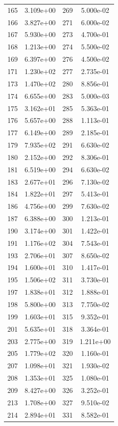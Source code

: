 \documentclass[12pt]{article}
\begin{document}
\begin{longtable}{@{}cccc@{}}
165 & 3.109e+00 & 269 & 5.000e-02 \\
166 & 3.827e+00 & 271 & 6.000e-02 \\
167 & 5.930e+00 & 273 & 4.700e-01 \\
168 & 1.213e+00 & 274 & 5.500e-02 \\
169 & 6.397e+00 & 276 & 4.500e-02 \\
171 & 1.230e+02 & 277 & 2.735e-01 \\
173 & 1.470e+02 & 280 & 8.856e-01 \\
174 & 6.655e+00 & 283 & 5.000e-03 \\
175 & 3.162e+01 & 285 & 5.363e-01 \\
176 & 5.657e+00 & 288 & 1.113e-01 \\
177 & 6.149e+00 & 289 & 2.185e-01 \\
179 & 7.935e+02 & 291 & 6.630e-02 \\
180 & 2.152e+00 & 292 & 8.306e-01 \\
181 & 6.519e+00 & 294 & 6.630e-02 \\
183 & 2.677e+01 & 296 & 7.130e-02 \\
184 & 1.822e+01 & 297 & 5.413e-01 \\
186 & 4.756e+00 & 299 & 7.630e-02 \\
187 & 6.388e+00 & 300 & 1.213e-01 \\
190 & 3.174e+00 & 301 & 1.422e-01 \\
191 & 1.176e+02 & 304 & 7.543e-01 \\
193 & 2.706e+01 & 307 & 8.650e-02 \\
194 & 1.600e+01 & 310 & 1.417e-01 \\
195 & 1.506e+02 & 311 & 3.730e-01 \\
197 & 1.838e+01 & 312 & 1.888e-01 \\
198 & 5.800e+00 & 313 & 7.750e-02 \\
199 & 1.603e+01 & 315 & 9.352e-01 \\
201 & 5.635e+01 & 318 & 3.364e-01 \\
203 & 2.775e+00 & 319 & 1.211e+00 \\
205 & 1.779e+02 & 320 & 1.160e-01 \\
207 & 1.098e+01 & 321 & 1.930e-02 \\
208 & 1.353e+01 & 325 & 1.080e-01 \\
209 & 8.427e+00 & 326 & 3.252e-01 \\
213 & 1.708e+00 & 327 & 9.510e-02 \\
214 & 2.894e+01 & 331 & 8.582e-01 \\

\end{longtable}
\end{document}
